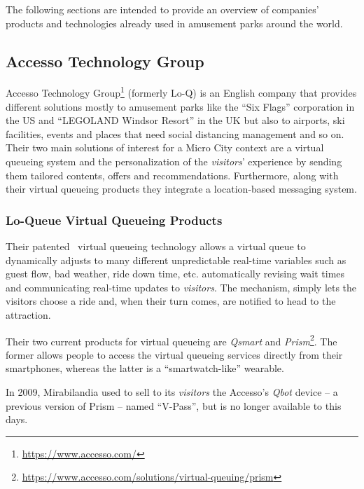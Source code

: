 The following sections are intended to provide an overview of companies' products and technologies already used in amusement parks around the world.

\subsection{Accesso Technology Group}\label{subsec:accesso-technology-group}
Accesso Technology Group\footnote{\url{https://www.accesso.com/}} (formerly Lo-Q) is an English company that provides different solutions
mostly to amusement parks like the ``Six Flags'' corporation in the US and ``LEGOLAND Windsor Resort'' in the UK but also to airports,
ski facilities, events and places that need social distancing management and so on.
Their two main solutions of interest for a Micro City context are a virtual queueing system and the personalization of
the \textit{visitors}' experience by sending them tailored contents, offers and recommendations.
Furthermore, along with their virtual queueing products they integrate a location-based messaging system.

\subsubsection{Lo-Queue Virtual Queueing Products}
Their patented~\cite{q-management-system-patent} \cite{q-system-patent}
virtual queueing technology allows a virtual queue to dynamically adjusts to many different unpredictable real-time variables such
as guest flow, bad weather, ride down time, etc.
automatically revising wait times and communicating real-time updates to \textit{visitors}.
The mechanism, simply lets the visitors choose a ride and, when their turn comes, are notified to head to the attraction.

Their two current products for virtual queueing are \textit{Qsmart} and \textit{Prism}\footnote{\url{https://www.accesso.com/solutions/virtual-queuing/prism}}.
The former allows people to access the virtual queueing services directly from their smartphones, whereas the latter is a ``smartwatch-like''
wearable.

In 2009, Mirabilandia used to sell to its \textit{visitors} the Accesso's \textit{Qbot} device -- a previous version of Prism -- named ``V-Pass''\cite{v-pass-mira}, but is no
longer available to this days.

